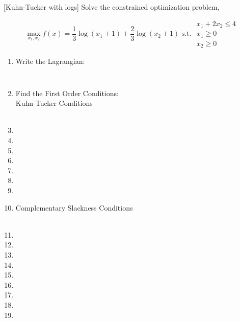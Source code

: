 \documentclass[]{book}
\theoremstyle{definition}
\theoremstyle{definition}
\theoremstyle{definition}
\theoremstyle{remark}
\begin{document}
[Kuhn-Tucker with logs]
\protect\hypertarget{exr:unnamed-chunk-64}{}{\label{exr:unnamed-chunk-64} {} }Solve the constrained optimization problem,

\[\max_{x_1,x_2} f(x) = \frac{1}{3}\log (x_1 + 1) + \frac{2}{3}\log (x_2 + 1) \text{ s.t. }  
\begin{array}{l}
x_1 + 2x_2 \leq 4\\
     x_1 \geq 0\\
    x_2 \geq 0
\end{array}\]

\begin{enumerate}
\item Write the Lagrangian:
$$\phantom{L(x_1, x_2, \lambda) =  \frac{1}{3}\log(x_1+1) + \frac{2}{3}\log(x_2+1) - \lambda(x_1 + 2x_2 - 4)}$$

\item Find the First Order Conditions:\\
Kuhn-Tucker Conditions\\
\\
\item[]
\item[]
\item[]
\item[]
\item[]
\item[]
\item[]
\item[]
 
Complementary Slackness Conditions\\
\\
\item[]
\item[]
\item[]
\item[]
\item[]
\item[]
\item[]
\item[]
\item[]


\end{enumerate}
\end{document}
